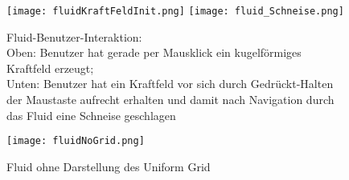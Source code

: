 	


\begin{figure}[!h]
	\texttt{[image: fluidKraftFeldInit.png]} 
	\texttt{[image: fluid\_Schneise.png]}
	\caption{ 
		Fluid-Benutzer-Interaktion:\\
		Oben: Benutzer hat gerade per Mausklick ein kugelförmiges Kraftfeld erzeugt;\\
		Unten: Benutzer hat ein Kraftfeld vor sich durch Gedrückt-Halten der Maustaste aufrecht erhalten
		und damit nach Navigation durch das Fluid eine Schneise geschlagen
	}
	\label{fig:fluidSimForcePix}
\end{figure}

\begin{figure}[!h]
	\texttt{[image: fluidNoGrid.png]} 
	\caption{ 
		Fluid ohne Darstellung des Uniform Grid
	}
	\label{fig:fluidNoGrid}
\end{figure}







\clearpage
